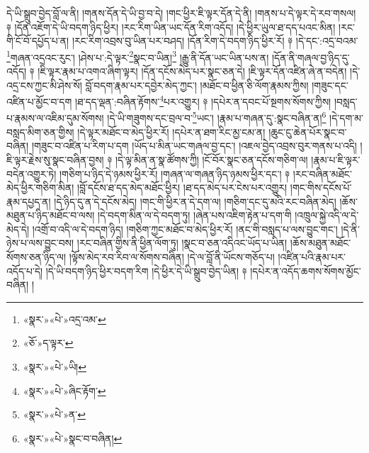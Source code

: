 དེ་ཡི་སྒྲུབ་བྱེད་བློ་ལ་ནི། །གནས་དོན་དེ་ཡི་བྱ་བ་དེ། །གང་ཕྱིར་ཇི་ལྟར་དོན་དེ་ནི། །གནས་པ་དེ་ལྟར་དེ་རབ་གསལ། ༈ །དོན་འཇོག་དེ་ཡི་བདག་ཉིད་ཕྱིར། །རང་རིག་ཡིན་ཡང་དོན་རིག་འདོད། །དེ་ཕྱིར་ཡུལ་ཐ་དད་པའང་མིན། །རང་གི་ངོ་བོ་དཔྱོད་པ་ན། །རང་རིག་འབྲས་བུ་ཡིན་པར་བཤད། །དོན་རིག་དེ་བདག་ཉིད་ཕྱིར་རོ། ༈ །དེ་དང་:འདྲ་བའམ་\footnote{«སྣར་»«པེ་»འདྲ་འམ་}གཞན་འདྲའང་རུང་། །ཤེས་པ་:དེ་ལྟར་\footnote{«ཅོ་»ད་ལྟར་}སྣང་བ་ཡིན།\footnote{«སྣར་»«པེ་»ཡི།} །རྒྱུ་ནི་དོན་ཡང་ཡིན་པས་ན། །དོན་ནི་གཞལ་བྱ་ཉིད་དུ་འདོད། ༈ །ཇི་ལྟར་རྣམ་པ་འགའ་ཞིག་ལྟར། །དོན་དངོས་མེད་པར་སྣང་ཅན་དེ། །ཇི་ལྟར་དོན་འཛིན་ཞེ་ན་བདེན། །དེ་འདྲ་ངས་ཀྱང་མི་ཤེས་སོ། བློ་བདག་རྣམ་པར་དབྱེར་མེད་ཀྱང་། །མཐོང་བ་ཕྱིན་ཅི་ལོག་རྣམས་ཀྱིས། །གཟུང་དང་འཛིན་པ་མྱོང་བ་དག །ཐ་དད་ལྡན་:བཞིན་རྟོགས་\footnote{«སྣར་»«པེ་»ཞིང་རྟོག་}པར་འགྱུར། ༈ །དཔེར་ན་དབང་པོ་སྔགས་སོགས་ཀྱིས། །བསླད་པ་རྣམས་ལ་འཇིམ་དུམ་སོགས། །དེ་ཡི་གཟུགས་དང་བྲལ་བ་\footnote{«སྣར་»«པེ་»ན་}ཡང་། །རྣམ་པ་གཞན་དུ་:སྣང་བཞིན་ན།\footnote{«སྣར་»«པེ་»སྣང་བ་བཞིན།} །དེ་དག་མ་བསླད་མིག་ཅན་གྱིས། །དེ་ལྟར་མཐོང་བ་མེད་ཕྱིར་རོ། །དཔེར་ན་ཐག་རིང་མྱ་ངམ་ན། །ཆུང་ངུ་ཆེན་པོར་སྣང་བ་བཞིན། །གཟུང་བ་འཛིན་པ་རིག་པ་དག །ཡོད་པ་མིན་ཡང་གཞལ་བྱ་དང་། །འཇལ་བྱེད་འབྲས་བུར་གནས་པ་འདི། །ཇི་ལྟར་རྗེས་སུ་སྣང་བཞིན་བྱས། ༈ །དེ་ལྟ་མིན་ན་སྣ་ཚོགས་ཀྱི། །ངོ་བོར་སྣང་ཅན་དངོས་གཅིག་ལ། །རྣམ་པ་ཇི་ལྟར་བདེན་འགྱུར་ཏེ། །གཅིག་པ་ཉིད་དེ་ཉམས་ཕྱིར་རོ། །གཞན་ལ་གཞན་ཉིད་ཉམས་ཕྱིར་དང་། ༈ །རང་བཞིན་མཐོང་མེད་ཕྱིར་གཅིག་མིན། །བློ་དངོས་ཐ་དད་མེད་མཐོང་ཕྱིར། །ཐ་དད་མེད་པར་ངེས་པར་འགྱུར། །གང་གིས་དངོས་པོ་རྣམ་དཔྱད་ན། །དེ་ཉིད་དུ་ན་དེ་དངོས་མེད། །གང་གི་ཕྱིར་ན་དེ་དག་ལ། །གཅིག་དང་དུ་མའི་རང་བཞིན་མེད། །ཆོས་མཐུན་པ་ཉིད་མཐོང་བ་ལས། །དེ་བདག་མིན་ལ་དེ་བདག་ཏུ། །ཞེན་པས་འཇིག་རྟེན་པ་དག་གི །འཁྲུལ་སྐྱེ་འདི་ལ་དེ་མེད་དེ། །འགྲོ་བ་འདི་ལ་དེ་བདག་ཉིད། །གཅིག་ཀྱང་མཐོང་བ་མེད་ཕྱིར་རོ། །ནང་གི་བསླད་པ་ལས་བྱུང་གང་། །དེ་ནི་ཉེས་པ་ལས་བྱུང་བས། །རང་བཞིན་གྱིས་ནི་ཕྱིན་ལོག་ཏུ། །སྣང་བ་ཅན་འདིའང་ཡོད་པ་ཡིན། །ཆོས་མཐུན་མཐོང་སོགས་ཅན་ཉིད་ལ། །ལྟོས་མེད་རབ་རིབ་ལ་སོགས་བཞིན། །དེ་ལ་བློ་ནི་ཡོངས་གཅོད་པ། །འཛིན་པའི་རྣམ་པར་འདོད་པ་དེ། །དེ་ཡི་བདག་ཉིད་ཕྱིར་བདག་རིག །དེ་ཕྱིར་དེ་ཡི་སྒྲུབ་བྱེད་ཡིན། ༈ །དཔེར་ན་འདོད་ཆགས་སོགས་མྱོང་བཞིན། །
